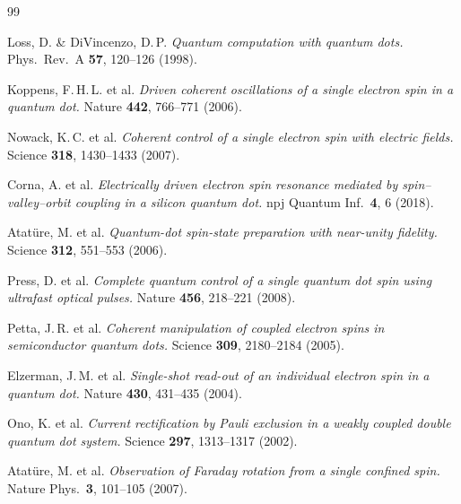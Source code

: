 
\begin{thebibliography}{99}

Loss, D. \& DiVincenzo, D.\,P.
\textit{Quantum computation with quantum dots.}
Phys.\ Rev.\ A \textbf{57}, 120--126 (1998).

Koppens, F.\,H.\,L. et al.
\textit{Driven coherent oscillations of a single electron spin in a quantum dot.}
Nature \textbf{442}, 766--771 (2006).

Nowack, K.\,C. et al.
\textit{Coherent control of a single electron spin with electric fields.}
Science \textbf{318}, 1430--1433 (2007).

Corna, A. et al.
\textit{Electrically driven electron spin resonance mediated by
spin--valley--orbit coupling in a silicon quantum dot.}
npj Quantum Inf.\ \textbf{4}, 6 (2018).

Atatüre, M. et al.
\textit{Quantum-dot spin-state preparation with near-unity fidelity.}
Science \textbf{312}, 551--553 (2006).

Press, D. et al.
\textit{Complete quantum control of a single quantum dot spin using
ultrafast optical pulses.}
Nature \textbf{456}, 218--221 (2008).

Petta, J.\,R. et al.
\textit{Coherent manipulation of coupled electron spins in semiconductor
quantum dots.}
Science \textbf{309}, 2180--2184 (2005).

Elzerman, J.\,M. et al.
\textit{Single-shot read-out of an individual electron spin in a quantum dot.}
Nature \textbf{430}, 431--435 (2004).

Ono, K. et al.
\textit{Current rectification by Pauli exclusion in a weakly coupled
double quantum dot system.}
Science \textbf{297}, 1313--1317 (2002).

Atatüre, M. et al.
\textit{Observation of Faraday rotation from a single confined spin.}
Nature Phys.\ \textbf{3}, 101--105 (2007).


\end{thebibliography}
